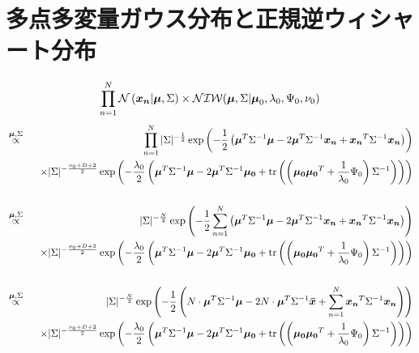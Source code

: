 \documentclass[a4j]{jarticle}
\begin{document}
\section{多点多変量ガウス分布と正規逆ウィシャート分布}

\begin{eqnarray}
\prod_{n=1}^{N}{\operatorname{\mathcal{N}}{(\boldsymbol{x_n} | \boldsymbol{\mu}, \Sigma)}} \times \operatorname{\mathcal{NIW}}(\boldsymbol{\mu}, \Sigma | \boldsymbol{\mu}_0, \lambda_0, \Psi_0, \nu_0)
\end{eqnarray}
\begin{eqnarray}
&\overset{\boldsymbol{\mu}, \Sigma}{\propto}&
\prod_{n=1}^{N}{|\Sigma|^{-\frac{1}{2}} \exp{\left( -\frac{1}{2}\left(\boldsymbol{\mu}^T \Sigma^{-1}\boldsymbol{\mu} - 2 \boldsymbol{\mu}^T \Sigma^{-1} \boldsymbol{x_n} + \boldsymbol{x_n}^T \Sigma^{-1} \boldsymbol{x_n}\right) \right)}} \nonumber\\
&&~~\times
|\Sigma|^{-\frac{\nu_0+D+2}{2}} \exp{\left( -\frac{\lambda_0}{2} \left( \boldsymbol{\mu}^T \Sigma^{-1}\boldsymbol{\mu} - 2 \boldsymbol{\mu}^T \Sigma^{-1} \boldsymbol{\mu_0} + \textrm{tr}\left(\left( \boldsymbol{\mu_0} \boldsymbol{\mu_0}^T + \frac{1}{\lambda_0} \Psi_0 \right) \Sigma^{-1} \right) \right)\right)} \nonumber \\
\\
&\overset{\boldsymbol{\mu}, \Sigma}{\propto}&
|\Sigma|^{-\frac{N}{2}} \exp{\left( -\frac{1}{2} \sum_{n=1}^{N}{\left(\boldsymbol{\mu}^T \Sigma^{-1}\boldsymbol{\mu} - 2 \boldsymbol{\mu}^T \Sigma^{-1} \boldsymbol{x_n} + \boldsymbol{x_n}^T \Sigma^{-1} \boldsymbol{x_n}\right)} \right)} \nonumber\\
&&~~\times
|\Sigma|^{-\frac{\nu_0+D+2}{2}} \exp{\left( -\frac{\lambda_0}{2} \left( \boldsymbol{\mu}^T \Sigma^{-1}\boldsymbol{\mu} - 2 \boldsymbol{\mu}^T \Sigma^{-1} \boldsymbol{\mu_0} + \textrm{tr}\left(\left( \boldsymbol{\mu_0} \boldsymbol{\mu_0}^T + \frac{1}{\lambda_0} \Psi_0 \right) \Sigma^{-1} \right) \right)\right)} \nonumber \\
\\
&\overset{\boldsymbol{\mu}, \Sigma}{\propto}&
|\Sigma|^{-\frac{N}{2}} \exp{\left( -\frac{1}{2} \left(N \cdot \boldsymbol{\mu}^T \Sigma^{-1}\boldsymbol{\mu} - 2 N \cdot \boldsymbol{\mu}^T \Sigma^{-1} \boldsymbol{\bar{x}} + \sum_{n=1}^{N}{\boldsymbol{x_n}^T \Sigma^{-1} \boldsymbol{x_n}} \right) \right)} \nonumber\\
&&~~\times
|\Sigma|^{-\frac{\nu_0+D+2}{2}} \exp{\left( -\frac{\lambda_0}{2} \left( \boldsymbol{\mu}^T \Sigma^{-1}\boldsymbol{\mu} - 2 \boldsymbol{\mu}^T \Sigma^{-1} \boldsymbol{\mu_0} + \textrm{tr}\left(\left( \boldsymbol{\mu_0} \boldsymbol{\mu_0}^T + \frac{1}{\lambda_0} \Psi_0 \right) \Sigma^{-1} \right) \right)\right)} \nonumber \\
\end{eqnarray}
\end{document}
